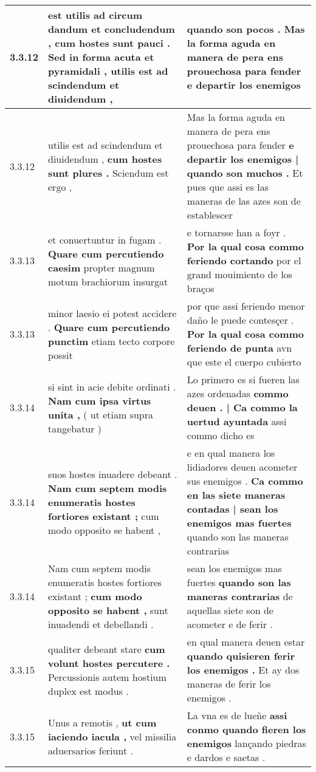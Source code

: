 \begin{tabular}{|p{1cm}|p{6.5cm}|p{6.5cm}|}
3.3.12 & est utilis ad circum dandum et concludendum , \textbf{ cum hostes sunt pauci . Sed in forma acuta et pyramidali , } utilis est ad scindendum et diuidendum , & quando son pocos . \textbf{ Mas la forma aguda en manera de pera ens prouechosa para fender } e departir los enemigos \\\hline
3.3.12 & utilis est ad scindendum et diuidendum , \textbf{ cum hostes sunt plures . } Sciendum est ergo , & Mas la forma aguda en manera de pera ens prouechosa para fender \textbf{ e departir los enemigos | quando son muchos . } Et pues que assi es las maneras de las azes son de establescer \\\hline
3.3.13 & et conuertuntur in fugam . \textbf{ Quare cum percutiendo caesim } propter magnum motum brachiorum insurgat & e tornarsse han a foyr . \textbf{ Por la qual cosa commo feriendo cortando } por el grand mouimiento de los braços \\\hline
3.3.13 & minor laesio ei potest accidere . \textbf{ Quare cum percutiendo punctim } etiam tecto corpore possit & por que assi feriendo menor daño le puede contesçer . \textbf{ Por la qual cosa commo feriendo de punta } avn que este el cuerpo cubierto \\\hline
3.3.14 & si sint in acie debite ordinati . \textbf{ Nam cum ipsa virtus unita , } ( ut etiam supra tangebatur ) & Lo primero es si fueren las azes ordenadas \textbf{ commo deuen . | Ca commo la uertud ayuntada } assi commo dicho es \\\hline
3.3.14 & suos hostes inuadere debeant . \textbf{ Nam cum septem modis enumeratis hostes fortiores existant ; } cum modo opposito se habent , & e en qual manera los lidiadores deuen acometer sus enemigos . \textbf{ Ca commo en las siete maneras contadas | sean los enemigos mas fuertes } quando son las maneras contrarias \\\hline
3.3.14 & Nam cum septem modis enumeratis hostes fortiores existant ; \textbf{ cum modo opposito se habent , } sunt inuadendi et debellandi . & sean los enemigos mas fuertes \textbf{ quando son las maneras contrarias } de aquellas siete son de acometer e de ferir . \\\hline
3.3.15 & qualiter debeant stare \textbf{ cum volunt hostes percutere . } Percussionis autem hostium duplex est modus . & en qual manera deuen estar \textbf{ quando quisieren ferir los enemigos . } Et ay dos maneras de ferir los enemigos . \\\hline
3.3.15 & Unus a remotis , \textbf{ ut cum iaciendo iacula , } vel missilia aduersarios feriunt . & La vna es de lueñe \textbf{ assi conmo quando fieren los enemigos } lançando piedras e dardos e saetas . \\\hline

\end{tabular}
